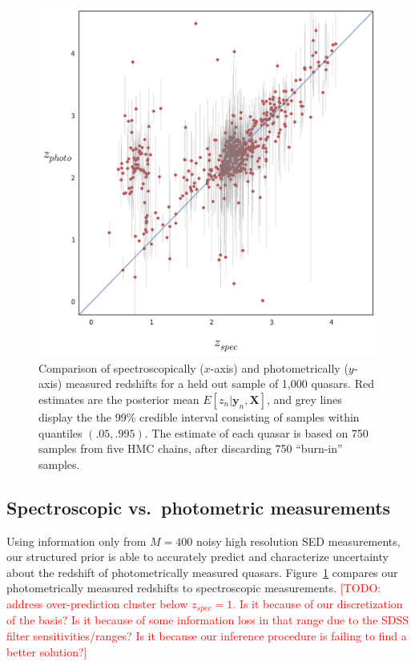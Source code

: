 \documentclass{article}
\newcommand{\red}[1]{\textcolor{red}{[TODO: #1]}}
\begin{document}
\begin{figure}[h]
\vskip 0.2in
\begin{center}
\centerline{\includegraphics[width=\columnwidth]{../figs/red-shift-test-predictions}}
\vskip -0.2in
\caption{Comparison of spectroscopically ($x$-axis) and photometrically ($y$-axis) measured redshifts for a held out sample of 1,000 quasars.  Red estimates are the posterior mean $E[z_n | \mathbf{y}_n, \mathbf{X}]$, and grey lines display the the 99\% credible interval consisting of samples within quantiles $(.05, .995)$.  The estimate of each quasar is based on 750 samples from five HMC chains, after discarding 750 ``burn-in'' samples. }
\label{fig:vs}
\end{center}
\end{figure}


\subsection{Spectroscopic vs.~photometric measurements}

Using information only from $M = 400$ noisy high resolution SED measurements, our structured prior is able to accurately predict and characterize uncertainty about the redshift of photometrically measured quasars.  
Figure~\ref{fig:vs} compares our photometrically measured redshifts to spectroscopic measurements.  
\red{ address over-prediction cluster below $z_{spec} = 1$.  Is it because of our discretization of the basis?  Is it because of some information loss in that range due to the SDSS filter sensitivities/ranges?  Is it because our inference procedure is failing to find a better solution?}
\end{document}
